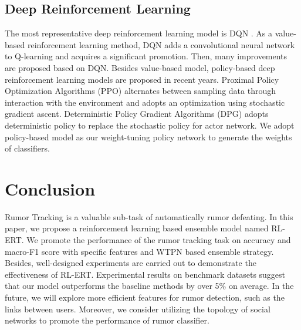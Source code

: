 \documentclass[review]{elsarticle}
\begin{document}
\subsection{Deep Reinforcement Learning}
The most representative deep reinforcement learning model is DQN \cite{DBLP:journals/corr/MnihKSGAWR13}. As a value-based reinforcement learning method, DQN adds a convolutional neural network to Q-learning \cite{DBLP:journals/ml/WatkinsD92} and acquires a significant promotion. Then, many improvements \cite{DBLP:journals/nature/MnihKSRVBGRFOPB15, DBLP:conf/aaai/HasseltGS16} are proposed based on DQN. Besides value-based model, policy-based deep reinforcement learning models are proposed in recent years. Proximal Policy Optimization Algorithms (PPO) \cite{DBLP:journals/corr/SchulmanWDRK17} alternates between sampling data through interaction with the environment and adopts an optimization using stochastic gradient ascent. Deterministic Policy Gradient Algorithms (DPG) \cite{DBLP:conf/icml/SilverLHDWR14} adopts deterministic policy to replace the stochastic policy for actor network. We adopt policy-based model as our weight-tuning policy network to generate the weights of classifiers.

\section{Conclusion}
\label{sec:conclusion}
Rumor Tracking is a valuable sub-task of automatically rumor defeating. In this paper, we propose a reinforcement learning based ensemble model named RL-ERT. We promote the performance of the rumor tracking task on accuracy and macro-F1 score with specific features and WTPN based ensemble strategy. Besides, well-designed experiments are carried out to demonstrate the effectiveness of RL-ERT. Experimental results on benchmark datasets suggest that our model outperforms the baseline methods by over 5\% on average. In the future, we will explore more efficient features for rumor detection, such as the links between users. Moreover, we consider utilizing the topology of social networks to promote the performance of rumor classifier.


\end{document}
